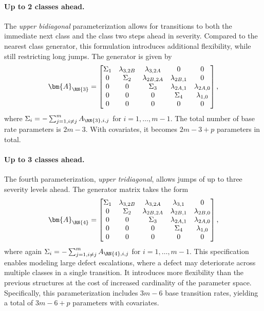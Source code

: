 \paragraph{Up to 2 classes ahead.}
The \textit{upper bidiagonal} parameterization allows for transitions to both the immediate next class and the class two steps ahead in severity. Compared to the nearest class generator, this formulation introduces additional flexibility, while still restricting long jumps. The generator is given by
\begin{align}
\bm{A}_{\RN{3}} = \begin{bmatrix}
\Sigma_1 & \lambda_{3,2B} & \lambda_{3,2A} & 0 & 0 \\
0 & \Sigma_2 & \lambda_{2B,2A} & \lambda_{2B,1} & 0 \\
0 & 0 & \Sigma_3 & \lambda_{2A,1} & \lambda_{2A,0} \\
0 & 0 & 0 & \Sigma_4 & \lambda_{1,0} \\
0 & 0 & 0 & 0 & 0 \\
\end{bmatrix}, \label{eq:generator_bidiagonal}
\end{align}
where $\Sigma_i = -\sum_{j=1, i \neq j}^m A_{\RN{3},i,j}$ for $i = 1, \dots, m-1$.
The total number of base rate parameters is $2m - 3$. With covariates, it becomes $2m - 3 + p$ parameters in total.

\paragraph{Up to 3 classes ahead.}
The fourth parameterization, \textit{upper tridiagonal}, allows jumps of up to three severity levels ahead. The generator matrix takes the form
\begin{align}
\bm{A}_{\RN{4}}= \begin{bmatrix}
\Sigma_1 & \lambda_{3,2B} & \lambda_{3,2A} & \lambda_{3,1} & 0 \\
0 & \Sigma_2 & \lambda_{2B,2A} & \lambda_{2B,1} & \lambda_{2B,0} \\
0 & 0 & \Sigma_3 & \lambda_{2A,1} & \lambda_{2A,0} \\
0 & 0 & 0 & \Sigma_4 & \lambda_{1,0} \\
0 & 0 & 0 & 0 & 0 \\
\end{bmatrix}, \label{eq:generator_tridiagonal}
\end{align}
where again $\Sigma_i = -\sum_{j=1, i \neq j}^m A_{\RN{4},i,j}$ for $i = 1, \dots, m-1$.
This specification enables modeling large defect escalations, where a defect may deteriorate across multiple classes in a single transition. It introduces more flexibility than the previous structures at the cost of increased cardinality of the parameter space. Specifically, this parameterization includes $3m - 6$ base transition rates, yielding a total of $3m - 6 + p$ parameters with covariates.


